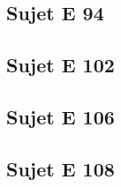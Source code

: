 



\subsection*{Sujet E 94}

%




\subsection*{Sujet E 102}





\subsection*{Sujet E 106}





\subsection*{Sujet E 108}





